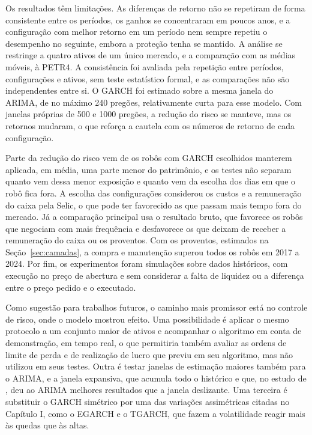 Os resultados têm limitações. As diferenças de retorno não se repetiram de forma
consistente entre os períodos, os ganhos se concentraram em poucos anos, e a
configuração com melhor retorno em um período nem sempre repetiu o desempenho no
seguinte, embora a proteção tenha se mantido. A análise se restringe a quatro
ativos de um único mercado, e a comparação com as médias móveis, à PETR4. A
consistência foi avaliada pela repetição entre períodos, configurações e ativos,
sem teste estatístico formal, e as comparações não são independentes entre si. O
GARCH foi estimado sobre a mesma janela do ARIMA, de no máximo 240 pregões,
relativamente curta para esse modelo. Com janelas próprias de 500 e 1000 pregões, a redução do risco
se manteve, mas os retornos mudaram, o que reforça a cautela com os números de
retorno de cada configuração.

Parte da redução do risco vem de os robôs com GARCH escolhidos manterem aplicada,
em média, uma parte menor do patrimônio, e os testes não separam quanto vem dessa
menor exposição e quanto vem da escolha dos dias em que o robô fica fora. A
escolha das configurações considerou os custos e a remuneração do caixa pela
Selic, o que pode ter favorecido as que passam mais tempo fora do mercado. Já a
comparação principal usa o resultado bruto, que favorece os robôs que negociam com
mais frequência e desfavorece os que deixam de receber a remuneração do caixa ou
os proventos. Com os proventos, estimados na Seção~\ref{sec:camadas}, a compra e
manutenção superou todos os robôs em 2017 a 2024. Por fim, os experimentos foram
simulações sobre dados históricos, com execução no preço de abertura e sem
considerar a falta de liquidez ou a diferença entre o preço pedido e o executado.

Como sugestão para trabalhos futuros, o caminho mais promissor está no controle
de risco, onde o modelo mostrou efeito. Uma possibilidade é aplicar o mesmo protocolo a um conjunto maior de
ativos e acompanhar o algoritmo em conta de demonstração, em tempo real, o que
permitiria também avaliar as ordens de limite de perda e de realização de lucro
que  previu em seu algoritmo, mas não utilizou em seus
testes. Outra é testar janelas de estimação maiores também para o ARIMA, e a
janela expansiva, que acumula todo o histórico e que, no estudo de
, deu ao ARIMA melhores resultados que a janela deslizante.
Uma terceira é substituir o GARCH simétrico por uma das variações assimétricas
citadas no Capítulo I, como o EGARCH e o TGARCH, que fazem a volatilidade reagir
mais às quedas que às altas.

